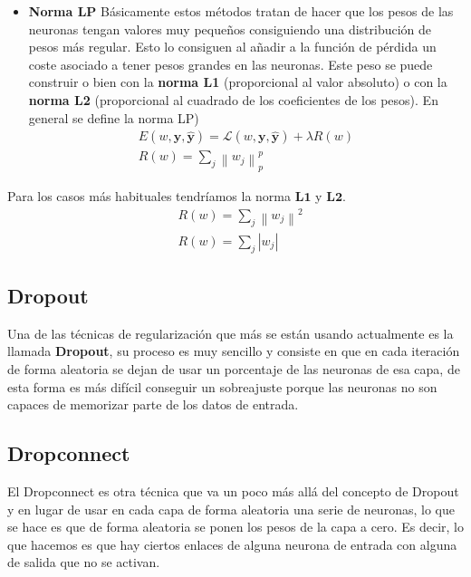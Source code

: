 \documentclass[
  a4paper,
  DIV=11,
  numbers=noendperiod]{scrreprt}
\providecommand{\tightlist}{%
  \setlength{\itemsep}{0pt}\setlength{\parskip}{0pt}}\usepackage{longtable,booktabs,array}
\begin{document}
\begin{itemize}
\tightlist
\item
  \textbf{Norma LP} Básicamente estos métodos tratan de hacer que los
  pesos de las neuronas tengan valores muy pequeños consiguiendo una
  distribución de pesos más regular. Esto lo consiguen al añadir a la
  función de pérdida un coste asociado a tener pesos grandes en las
  neuronas. Este peso se puede construir o bien con la \textbf{norma L1}
  (proporcional al valor absoluto) o con la \textbf{norma L2}
  (proporcional al cuadrado de los coeficientes de los pesos). En
  general se define la norma LP) \[
  \begin{gathered}
  E(w, \mathbf{y}, \hat{\mathbf{y}})=\mathcal{L}(w, \mathbf{y}, \hat{\mathbf{y}})+\lambda R(w) \\
  R(w)=\sum_j\left\|w_j\right\|_p^p
  \end{gathered}
  \]
\end{itemize}

Para los casos más habituales tendríamos la norma \(\mathbf{L 1}\) y
\(\mathbf{L 2}\). \[
\begin{aligned}
& R(w)=\sum_j\left\|w_j\right\|^2 \\
& R(w)=\sum_j\left|w_j\right|
\end{aligned}
\]

\subsection{Dropout}\label{dropout}

Una de las técnicas de regularización que más se están usando
actualmente es la llamada \textbf{Dropout}, su proceso es muy sencillo y
consiste en que en cada iteración de forma aleatoria se dejan de usar un
porcentaje de las neuronas de esa capa, de esta forma es más difícil
conseguir un sobreajuste porque las neuronas no son capaces de memorizar
parte de los datos de entrada.

\subsection{Dropconnect}\label{dropconnect}

El Dropconnect es otra técnica que va un poco más allá del concepto de
Dropout y en lugar de usar en cada capa de forma aleatoria una serie de
neuronas, lo que se hace es que de forma aleatoria se ponen los pesos de
la capa a cero. Es decir, lo que hacemos es que hay ciertos enlaces de
alguna neurona de entrada con alguna de salida que no se activan.
\end{document}
